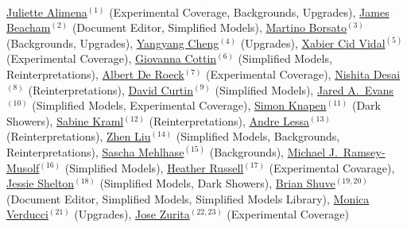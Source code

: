 

\\

\noindent  \href{mailto:juliette.alimena@cern.ch}{Juliette Alimena}$^{(1)}$ (Experimental Coverage, Backgrounds, Upgrades), \href{mailto:j.beacham@cern.ch}{James Beacham}$^{(2)}$ (Document Editor, Simplified Models), \href{mailto:martino.borsato@cern.ch}{Martino Borsato}$^{(3)}$ (Backgrounds, Upgrades),
\href{mailto:yangyang.cheng@cornell.edu}{Yangyang Cheng}$^{(4)}$ (Upgrades), \href{mailto:xabier.cid.vidal@cern.ch}{Xabier Cid Vidal}$^{(5)}$ (Experimental Coverage), \href{mailto:gcottin@phys.ntu.edu.tw}{Giovanna Cottin}$^{(6)}$ (Simplified Models, Reinterpretations), \href{mailto:deroeck@mail.cern.ch}{Albert De Roeck}$^{(7)}$ (Experimental Coverage), \href{mailto:ddesai@theory.tifr.res.in}{Nishita Desai}$^{(8)}$ (Reinterpretations), \href{mailto:dcurtin@physics.utoronto.ca}{David Curtin}$^{(9)}$ (Simplified Models), \href{mailto:jaredaevans@gmail.com}{Jared A.~Evans}$^{(10)}$ (Simplified Models, Experimental Coverage), \href{mailto:knapen@ias.edu}{Simon Knapen}$^{(11)}$ (Dark Showers), \href{mailto:sabine.kraml@lpsc.in2p3.fr}{Sabine Kraml}$^{(12)}$ (Reinterpretations), \href{mailto:andre.lessa@ufabc.edu.br}{Andre Lessa}$^{(13)}$ (Reinterpretations),  \href{mailto:zliuphys@umd.edu}{Zhen Liu}$^{(14)}$ (Simplified Models, Backgrounds, Reinterpretations), \href{mailto:sascha.mehlhase@cern.ch}{Sascha Mehlhase}$^{(15)}$ (Backgrounds), \href{mailto:mjrm@physics.umass.edu}{Michael J.~Ramsey-Musolf}$^{(16)}$ (Simplified Models),
\href{mailto:hrussell@cern.ch}{Heather Russell}$^{(17)}$ (Experimental Covarage), \href{mailto:sheltonj@illinois.edu}{Jessie Shelton}$^{(18)}$ (Simplified Models, Dark Showers), \href{mailto:bshuve@g.hmc.edu}{Brian Shuve}$^{(19,20)}$ (Document Editor, Simplified Models, Simplified Models Library),  \href{mailto:monica.verducci@cern.ch}{Monica Verducci}$^{(21)}$ (Upgrades), \href{mailto:jose.zurita@kit.edu}{Jose Zurita}$^{(22,23)}$ (Experimental Coverage)

\vspace{0.25cm}



\\

